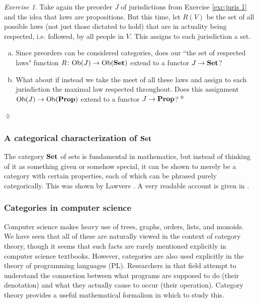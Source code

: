 \documentclass{book}
\def\tn{\textnormal}
\def\Ob{\tn{Ob}}
\def\to{\rightarrow}
\def\taking{\colon}
\def\Prop{{\bf Prop}}
\def\Set{{\bf Set}}
\theoremstyle{remark}
\newtheorem{exc}[subsubsection]{Exercise}
\newenvironment{exercise}{\begin{exc}}{\hspace*{\fill}$\lozenge$\end{exc}}
\theoremstyle{definition}
\def\sexc{\begin{enumerate}[a.)]\setlength{\itemsep}{.1cm}\setlength{\parskip}{.1cm}\item}
\def\next{\item}
\def\endsexc{\end{enumerate}}
\begin{document}
\begin{exercise}\label{exc:juris 2}
Take again the preorder $J$ of jurisdictions from Exercise \ref{exc:juris 1} and the idea that laws are propositions. But this time, let $R(V)$ be the set of all possible laws (not just those dictated to hold) that are in actuality being respected, i.e. followed, by all people in $V$. This assigns to each jurisdiction a set.
\sexc Since preorders can be considered categories, does our ``the set of respected laws" function $R\taking\Ob(J)\to\Ob(\Set)$ extend to a functor $J\to\Set$? 
\next What about if instead we take the meet of all these laws and assign to each jurisdiction the maximal law respected throughout. Does this assignment $\Ob(J)\to\Ob(\Prop)$ extend to a functor $J\to\Prop$?$~^{\arabic{footnote}}$
\endsexc
\end{exercise}


\subsubsection{A categorical characterization of $\Set$}
The category $\Set$ of sets is fundamental in mathematics, but instead of thinking of it as something given or somehow special, it can be shown to merely be a category with certain properties, each of which can be phrased purely categorically. This was shown by Lawvere \cite{Law}. A very readable account is given in \cite{Le2}.


\subsubsection{Categories in computer science}

Computer science makes heavy use of trees, graphs, orders, lists, and monoids. We have seen that all of these are naturally viewed in the context of category theory, though it seems that such facts are rarely mentioned explicitly in computer science textbooks. However, categories are also used explicitly in the theory of programming languages (PL). Researchers in that field attempt to understand the connection between what programs are supposed to do (their denotation) and what they actually cause to occur (their operation). Category theory provides a useful mathematical formalism in which to study this.
\end{document}
